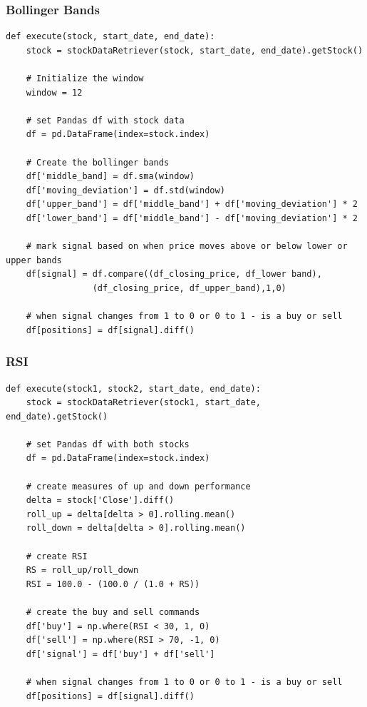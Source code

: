 \documentclass[letterpaper,11pt]{article}
\begin{document}
\subsubsection{Bollinger Bands }

\begin{verbatim}
def execute(stock, start_date, end_date):
    stock = stockDataRetriever(stock, start_date, end_date).getStock()

    # Initialize the window
    window = 12

    # set Pandas df with stock data
    df = pd.DataFrame(index=stock.index)

    # Create the bollinger bands
    df['middle_band] = df.sma(window)
    df['moving_deviation'] = df.std(window)
    df['upper_band'] = df['middle_band'] + df['moving_deviation'] * 2
    df['lower_band'] = df['middle_band'] - df['moving_deviation'] * 2

    # mark signal based on when price moves above or below lower or upper bands
    df[signal] = df.compare((df_closing_price, df_lower band), 
    		     (df_closing_price, df_upper_band),1,0)

    # when signal changes from 1 to 0 or 0 to 1 - is a buy or sell
    df[positions] = df[signal].diff()

\end{verbatim}

\subsubsection{RSI }

\begin{verbatim}
def execute(stock1, stock2, start_date, end_date):
    stock = stockDataRetriever(stock1, start_date, end_date).getStock()

    # set Pandas df with both stocks
    df = pd.DataFrame(index=stock.index)

    # create measures of up and down performance
    delta = stock['Close'].diff()
    roll_up = delta[delta > 0].rolling.mean()
    roll_down = delta[delta > 0].rolling.mean()
    
    # create RSI
    RS = roll_up/roll_down
    RSI = 100.0 - (100.0 / (1.0 + RS))

    # create the buy and sell commands
    df['buy'] = np.where(RSI < 30, 1, 0)
    df['sell'] = np.where(RSI > 70, -1, 0)
    df['signal'] = df['buy'] + df['sell']

    # when signal changes from 1 to 0 or 0 to 1 - is a buy or sell
    df[positions] = df[signal].diff()

\end{verbatim}
\end{document}
